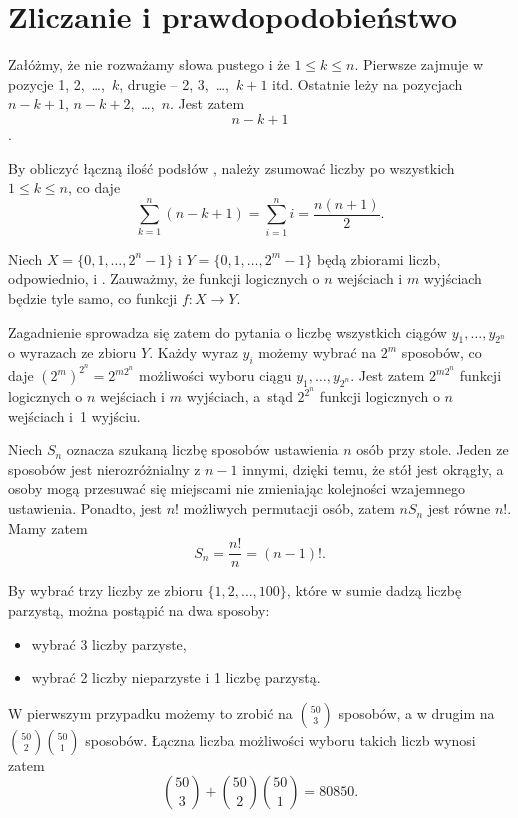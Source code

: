 \chapter{Zliczanie i prawdopodobieństwo}


\exercise{} %
\noindent Załóżmy, że nie rozważamy słowa pustego i że $1\le k\le n$. Pierwsze  zajmuje w~ pozycje 1, 2,~\dots,~$k$, drugie -- 2, 3,~\dots,~$k+1$ itd. Ostatnie  leży na pozycjach $n-k+1$, $n-k+2$,~\dots,~$n$. Jest zatem
\[
	n-k+1
\]
 .

By obliczyć łączną ilość podsłów , należy zsumować liczby  po wszystkich $1\le k\le n$, co daje
\[
	\sum_{k=1}^n(n-k+1) = \sum_{i=1}^ni = \frac{n(n+1)}{2}.
\]

\exercise{} %
\noindent Niech $X=\{0,1,\dots,2^n-1\}$ i $Y=\{0,1,\dots,2^m-1\}$ będą zbiorami liczb, odpowiednio,  i . Zauważmy, że funkcji logicznych o $n$ wejściach i $m$ wyjściach będzie tyle samo, co funkcji $f\colon X\to Y$.

Zagadnienie sprowadza się zatem do pytania o liczbę wszystkich ciągów $y_1,\dots,y_{2^n}$ o wyrazach ze zbioru  $Y$. Każdy wyraz $y_i$ możemy wybrać na $2^m$ sposobów, co daje $(2^m)^{2^n} = 2^{m2^n}$ możliwości wyboru ciągu $y_1,\dots,y_{2^n}$. Jest zatem $2^{m2^n}$ funkcji logicznych o $n$ wejściach i $m$ wyjściach, a~stąd $2^{2^n}$ funkcji logicznych o $n$ wejściach i~1 wyjściu.

\exercise{} %
\noindent Niech $S_n$ oznacza szukaną liczbę sposobów ustawienia $n$ osób przy stole. Jeden ze sposobów jest nierozróżnialny z $n-1$ innymi, dzięki temu, że stół jest okrągły, a osoby mogą przesuwać się miejscami nie zmieniając kolejności wzajemnego ustawienia. Ponadto, jest $n!$ możliwych permutacji osób, zatem $nS_n$ jest równe $n!$. Mamy zatem
\[
	S_n = \frac{n!}{n} = (n-1)!.
\]

\exercise{} %
\noindent By wybrać trzy liczby ze zbioru $\{1,2,\dots,100\}$, które w sumie dadzą liczbę parzystą, można postąpić na dwa sposoby:
\begin{itemize}
	\item wybrać 3 liczby parzyste,
	\item wybrać 2 liczby nieparzyste i 1 liczbę parzystą.
\end{itemize}
W pierwszym przypadku możemy to zrobić na $\binom{50}{3}$ sposobów, a w drugim na $\binom{50}{2}\binom{50}{1}$ sposobów. Łączna liczba możliwości wyboru takich liczb wynosi zatem
\[
	\binom{50}{3}+\binom{50}{2}\binom{50}{1} = 80850.
\]

